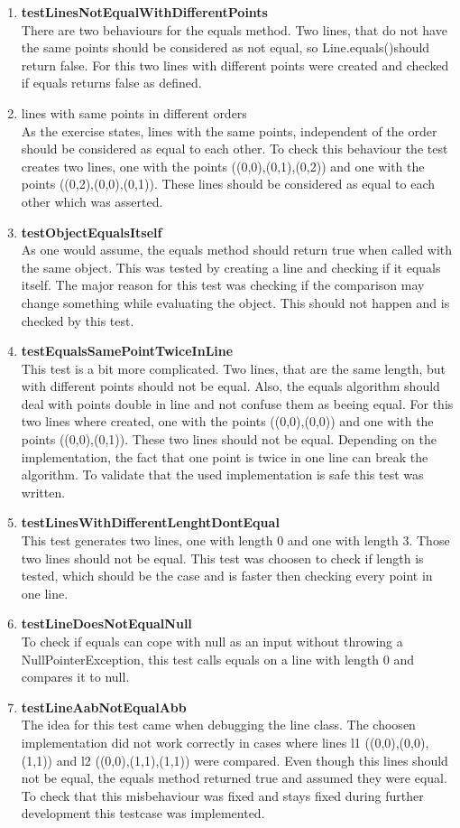 \begin{enumerate}
    \item \textbf{testLinesNotEqualWithDifferentPoints} \\
    There are two behaviours for the equals method. Two lines, that do not have the same points should be considered as not equal, so Line.equals()should return false. For this two lines with different points were created and checked if equals returns false as defined.
    \item lines with same points in different orders \\
    As the exercise states, lines with the same points, independent of the order should be considered as equal to each other. To check this behaviour the test creates two lines, one with the points ((0,0),(0,1),(0,2)) and one with the points ((0,2),(0,0),(0,1)). These lines should be considered as equal to each other which was asserted.
    \item \textbf{testObjectEqualsItself} \\
    As one would assume, the equals method should return true when called with the same object. This was tested by creating a line and checking if it equals itself. The major reason for this test was checking if the comparison may change something while evaluating the object. This should not happen and is checked by this test.
    \item \textbf{testEqualsSamePointTwiceInLine} \\
    This test is a bit more complicated. Two lines, that are the same length, but with different points should not be equal. Also, the equals algorithm should deal with points double in line and not confuse them as beeing equal. For this two lines where created, one with the points ((0,0),(0,0)) and one with the points ((0,0),(0,1)). These two lines should not be equal. Depending on the implementation, the fact that one point is twice in one line can break the algorithm. To validate that the used implementation is safe this test was written.
    \item \textbf{testLinesWithDifferentLenghtDontEqual} \\
    This test generates two lines, one with length 0 and one with length 3. Those two lines should not be equal. This test was choosen to check if length is tested, which should be the case and is faster then checking every point in one line.
    \item \textbf{testLineDoesNotEqualNull} \\
    To check if equals can cope with null as an input without throwing a NullPointerException, this test calls equals on a line with length 0 and compares it to null.
    \item \textbf{testLineAabNotEqualAbb} \\
    The idea for this test came when debugging the line class. The choosen implementation did not work correctly in cases where lines l1 ((0,0),(0,0),(1,1)) and l2 ((0,0),(1,1),(1,1)) were compared. Even though this lines should not be equal, the equals method returned true and assumed they were equal. To check that this misbehaviour was fixed and stays fixed during further development this testcase was implemented.
\end{enumerate}


